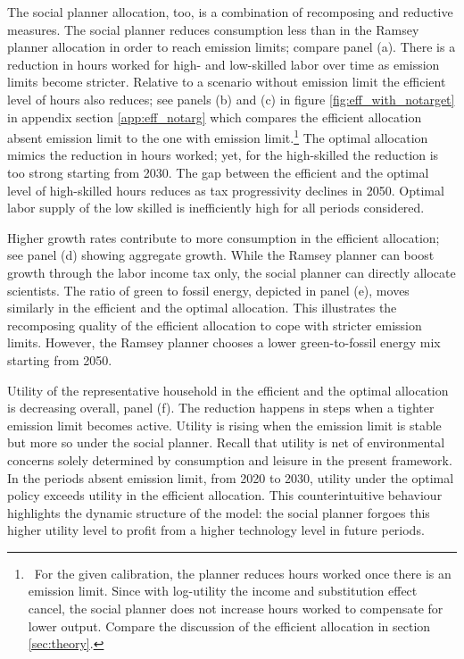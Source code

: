 The social planner allocation, too, is a combination of recomposing and reductive measures. 
The social planner reduces consumption less than in the Ramsey planner allocation in order to reach emission limits; compare panel (a). There is a reduction in hours worked for high- and low-skilled labor over time as emission limits become stricter. Relative to a scenario without emission limit the efficient level of hours also reduces; see panels (b) and (c) in figure \ref{fig:eff_with_notarget} in appendix section \ref{app:eff_notarg} which compares the efficient allocation absent emission limit to the one with emission limit.\footnote{\ For the given calibration, the planner reduces hours worked once there is an emission limit. Since with log-utility the income and substitution effect cancel, the social planner does not increase hours worked to compensate for lower output. Compare the discussion of the efficient allocation in section \ref{sec:theory}.} 
The optimal allocation mimics the reduction in hours worked; yet, for the high-skilled the reduction is too strong starting from 2030. The gap between the efficient and the optimal level of high-skilled hours reduces as tax progressivity declines in 2050. Optimal labor supply of the low skilled is inefficiently high for all periods considered.

Higher growth rates contribute to more consumption in the efficient allocation; see panel (d) showing aggregate growth. While the Ramsey planner can boost growth through the labor income tax only, the social planner can directly allocate scientists. The ratio of green to fossil energy, depicted in panel (e), moves similarly in the efficient and the optimal allocation. This illustrates the recomposing quality of the efficient allocation to cope with stricter emission limits. However, the Ramsey planner chooses a lower green-to-fossil energy mix starting from 2050. 

Utility of the representative household in the efficient and the optimal allocation is decreasing overall, panel (f). The reduction happens in steps when a tighter emission limit becomes active. Utility is rising when the emission limit is stable but more so under the social planner. Recall that utility is net of environmental concerns solely determined by consumption and leisure in the present framework. In the periods absent emission limit, from 2020 to 2030, utility under the optimal policy exceeds utility in the efficient allocation. This counterintuitive behaviour highlights the dynamic structure of the model: the social planner forgoes this higher utility level to profit from a higher technology level in future periods.


